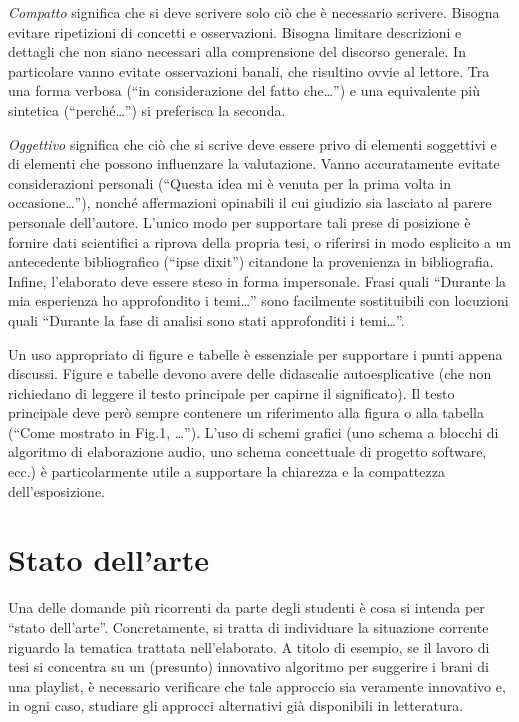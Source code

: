 \documentclass[12pt]{report}
\begin{document}
{\em Compatto} significa che si deve scrivere solo ci\`o che \`e necessario scrivere. Bisogna evitare ripetizioni di concetti e osservazioni. Bisogna limitare descrizioni e dettagli che non siano necessari alla comprensione del discorso generale. In particolare vanno evitate osservazioni banali, che risultino ovvie al lettore. Tra una forma verbosa (``in considerazione del fatto che\ldots'') e una equivalente pi\`u sintetica (``perch\'e\ldots'') si preferisca la seconda.

{\em Oggettivo} significa che ci\`o che si scrive deve essere privo di elementi soggettivi e di elementi che possono influenzare la valutazione. Vanno accuratamente evitate considerazioni personali (``Questa idea mi \`e venuta per la prima volta in occasione\ldots''), nonch\'e affermazioni opinabili il cui giudizio sia lasciato al parere personale dell'autore. L'unico modo per supportare tali prese di posizione è fornire dati scientifici a riprova della propria tesi, o riferirsi in modo esplicito a un antecedente bibliografico (``ipse dixit'') citandone la provenienza in bibliografia. Infine, l'elaborato deve essere steso in forma impersonale. Frasi quali ``Durante la mia esperienza ho approfondito i temi\dots'' sono facilmente sostituibili con locuzioni quali ``Durante la fase di analisi sono stati approfonditi i temi\dots''.

Un uso appropriato di figure e tabelle \`e essenziale per supportare i punti appena discussi. Figure e tabelle devono avere delle didascalie autoesplicative (che non richiedano di leggere il testo principale per capirne il significato). Il testo principale deve per\`o sempre contenere un riferimento alla figura o alla tabella (``Come mostrato in Fig.1, \ldots''). L'uso di schemi grafici (uno schema a blocchi di algoritmo di elaborazione audio, uno schema concettuale di progetto software, ecc.) \`e particolarmente utile a supportare la chiarezza e la compattezza dell'esposizione. 

% 
% 

\chapter{Stato dell'arte}
\label{chap:stato_arte}


Una delle domande più ricorrenti da parte degli studenti \`e cosa si intenda per ``stato dell'arte''. Concretamente, si tratta di individuare la situazione corrente riguardo la tematica trattata nell'elaborato. A titolo di esempio, se il lavoro di tesi si concentra su un (presunto) innovativo algoritmo per suggerire i brani di una playlist, è necessario verificare che tale approccio sia veramente innovativo e, in ogni caso, studiare gli approcci alternativi già disponibili in letteratura.
\end{document}
